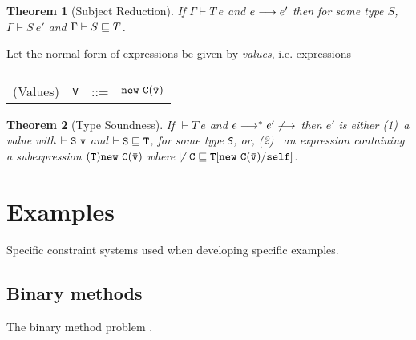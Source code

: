 \documentclass[nocopyrightspace,preprint,9pt]{sigplanconf}
\newtheorem{theorem}{Theorem}[section]
\begin{document}
\begin{theorem}[Subject Reduction] 

If $\Gamma \vdash T\ e$ and $e \derives e'$ then for some type $S$,
$\Gamma \vdash S\ e'$ and $\Gamma \vdash S \subtype T$.

\end{theorem}

Let the normal form of expressions be given by {\em values},
i.e. expressions 

\begin{tabular}{rrcl}
&&&\\
(Values) & {\tt v} &{::=}& $\new\ {\tt C(\bar{\tt v})}$
\end{tabular}

\begin{theorem}[Type Soundness] 

If $\vdash T\ e$ and $e \starderives e' \not\derives$ then $e'$ is
either (1)~a value {\tt } with $\vdash {\tt S\ v}$ and $\vdash {\tt S
\subtype T}$, for some type {\tt S}, or, (2)~ an expression containing
a subexpression ${\tt (T)\new\ C(\bar{\tt v})}$ where 
$\not\vdash \tt C\subtype T[\new\ C(\bar{\tt v})/\self]$.

\end{theorem}


\section{Examples}
\label{sec:examples}

%
%
%
%
%
%

Specific constraint systems used when developing specific
examples.

\subsection{Binary methods}

The binary method problem \cite{bruce}.
\end{document}

